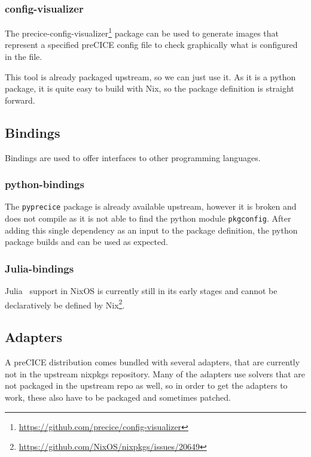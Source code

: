 \documentclass{eceasst}
\begin{document}
\subsubsection{config-visualizer}

The precice-config-visualizer\footnote{\url{https://github.com/precice/config-visualizer}} package can be used to generate images that represent a specified preCICE config file to check graphically what is configured in the file.

This tool is already packaged upstream, so we can just use it.
As it is a python package, it is quite easy to build with Nix, so the package definition is straight forward.

\subsection{Bindings}

Bindings are used to offer interfaces to other programming languages.

\subsubsection{python-bindings}

The \texttt{pyprecice} package is already available upstream, however it is broken and does not compile as it is not able to find the python module \texttt{pkgconfig}.
After adding this single dependency as an input to the package definition, the python package builds and can be used as expected.

\subsubsection{Julia-bindings}

Julia~\cite{bezanson2017julia} support in NixOS is currently still in its early stages and cannot be declaratively be defined by Nix\footnote{\url{https://github.com/NixOS/nixpkgs/issues/20649}}.

\subsection{Adapters}

A preCICE distribution comes bundled with several adapters, that are currently not in the upstream nixpkgs repository.
Many of the adapters use solvers that are not packaged in the upstream repo as well, so in order to get the adapters to work, these also have to be packaged and sometimes patched.
\end{document}
